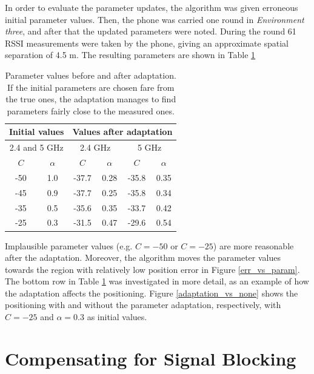 \documentclass{LTHthesis}
\begin{document}
In order to evaluate the parameter updates, the algorithm was given erroneous initial parameter values. Then, the phone was carried one round in \emph{Environment three}, and after that the updated parameters were noted. During the round 61 RSSI measurements were taken by the phone, giving an approximate spatial separation of 4.5 m. The resulting parameters are shown in Table \ref{table:parameter_adaptation}

\begin{table}[!hbt]
\begin{center}
\begin{tabular}{|c|c|c|c|c|c|}
\hline
\multicolumn{2}{|c|}{Initial values}
&\multicolumn{4}{|c|}{Values after adaptation} \\
\hline
\hline
\multicolumn{2}{|c|}{2.4 and 5 GHz}
&\multicolumn{2}{|c|}{2.4 GHz}
&\multicolumn{2}{|c|}{5 GHz} \\

\hline
$C$ & $\alpha$ & $C$ & $\alpha$& $C$& $\alpha$\\
\hline
-50 & 1.0 & -37.7 & 0.28 & -35.8 & 0.35\\
\hline
-45 & 0.9 & -37.7 & 0.25 & -35.8 & 0.34\\
\hline
-35 & 0.5 & -35.6 & 0.35 & -33.7 & 0.42\\
\hline
-25 & 0.3 & -31.5 & 0.47 & -29.6 & 0.54\\
\hline
\end{tabular}
\end{center}
\caption{Parameter values before and after adaptation. If the initial parameters are chosen fare from the true ones, the adaptation manages to find parameters fairly close to the measured ones. }\label{table:parameter_adaptation}
\end{table}

Implausible parameter values (e.g. $C = -50$ or $C = -25$) are more reasonable after the adaptation. Moreover, the algorithm moves the parameter values towards the region with relatively low position error in Figure \ref{err_vs_param}. The bottom row in Table \ref{table:parameter_adaptation} was investigated in more detail, as an example of how the adaptation affects the positioning. Figure \ref{adaptation_vs_none} shows the positioning with and without the parameter adaptation, respectively, with $C = -25$ and $\alpha = 0.3$ as initial values.

\section{Compensating for Signal Blocking} %
%
\end{document}

